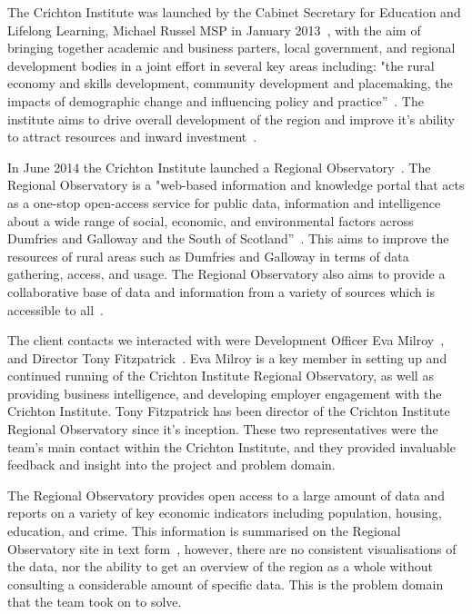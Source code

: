 \documentclass{l3proj}
\begin{document}

The Crichton Institute was launched by the Cabinet Secretary for Education and Lifelong Learning, Michael Russel MSP in January 2013~\cite{CrichtonInsituteFounded}, with the aim of bringing together academic and business parters, local government, and regional development bodies in a joint effort in several key areas including: "the rural economy and skills development, community development and placemaking, the impacts of demographic change and influencing policy and practice''~\cite{CrichtonInsituteCoreAims}. The institute aims to drive overall development of the region and improve it's ability to attract resources and inward investment~\cite{CrichtonInstituteAboutUs}.

In June 2014 the Crichton Institute launched a Regional Observatory~\cite{CrichtonInstituteRegionalObservatory}. The Regional Observatory is a "web-based information and knowledge portal that acts as a one-stop open-access service for public data, information and intelligence about a wide range of social, economic, and environmental factors across Dumfries and Galloway and the South of Scotland''~\cite{ScotGovOpenDataResourcePack}. This aims to improve the resources of rural areas such as Dumfries and Galloway in terms of data gathering, access, and usage. The Regional Observatory also aims to provide a collaborative base of data and information from a variety of sources which is accessible to all~\cite{ScotGovOpenDataResourcePack}.

The client contacts we interacted with were Development Officer Eva Milroy~\cite{EvaMilroyLinkedIn}, and Director Tony Fitzpatrick~\cite{TonyFitzpatrickLinkedIn}. Eva Milroy is a key member in setting up and continued running of the Crichton Institute Regional Observatory, as well as providing business intelligence, and developing employer engagement with the Crichton Institute. Tony Fitzpatrick has been director of the Crichton Institute Regional Observatory since it's inception. These two representatives were the team's main contact within the Crichton Institute, and they provided invaluable feedback and insight into the project and problem domain.


The Regional Observatory provides open access to a large amount of data and reports on a variety of key economic indicators including population, housing, education, and crime. This information is summarised on the Regional Observatory site in text form~\cite{PopulationHealthReport}, however, there are no consistent visualisations of the data, nor the ability to get an overview of the region as a whole without consulting a considerable amount of specific data. This is the problem domain that the team took on to solve.
\end{document}
